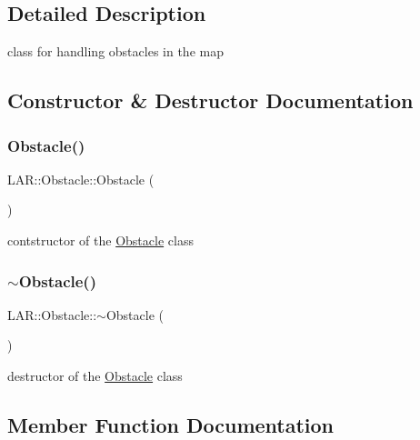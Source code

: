 \subsection{Detailed Description}
class for handling obstacles in the map 

\subsection{Constructor \& Destructor Documentation}
\mbox{\label{class_l_a_r_1_1_obstacle_a50654be1a82945b51a2078aec80ffed3}} 
\subsubsection{\texorpdfstring{Obstacle()}{Obstacle()}}
{\footnotesize\ttfamily L\+A\+R\+::\+Obstacle\+::\+Obstacle (\begin{DoxyParamCaption}{ }\end{DoxyParamCaption})}

contstructor of the \mbox{\hyperlink{class_l_a_r_1_1_obstacle}{Obstacle}} class \mbox{\label{class_l_a_r_1_1_obstacle_aa0717ccb71e9331a56581282b934453c}} 
\subsubsection{\texorpdfstring{$\sim$\+Obstacle()}{~Obstacle()}}
{\footnotesize\ttfamily L\+A\+R\+::\+Obstacle\+::$\sim$\+Obstacle (\begin{DoxyParamCaption}{ }\end{DoxyParamCaption})}

destructor of the \mbox{\hyperlink{class_l_a_r_1_1_obstacle}{Obstacle}} class 

\subsection{Member Function Documentation}
\mbox{\label{class_l_a_r_1_1_obstacle_aa3fd1dea2442cf16e78a7c95a6e55150}} 
